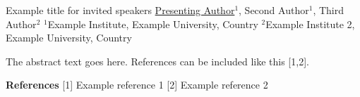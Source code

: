 \begin{abstract_talk}
    {%
        Example title for invited speakers
    }{%
        \underline{Presenting Author}$^1$, Second Author$^1$, Third Author$^2$
    }{%
        $^1$Example Institute, Example University, Country\newline{}
        $^2$Example Institute 2, Example University, Country\newline{}
    }{%
        \IStag
    }

    The abstract text goes here.
    References can be included like this [1,2].

    \textbf{References} \newline{}
    [1] Example reference 1\newline{}
    [2] Example reference 2\newline{}

\end{abstract_talk}
    
